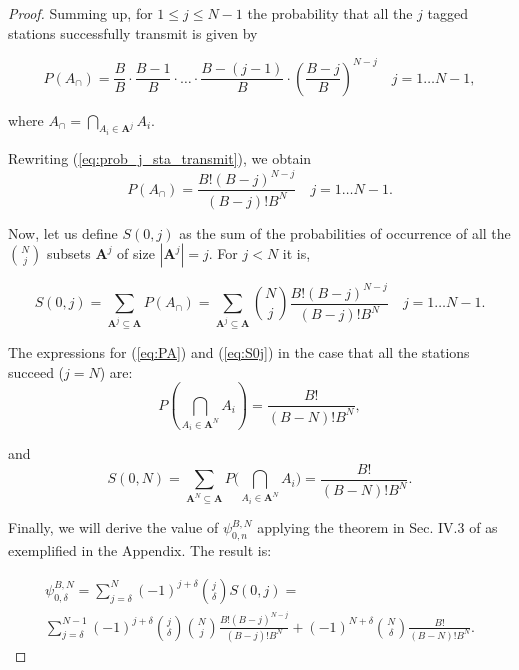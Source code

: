 \documentclass[journal]{IEEEtran}
\begin{document}
\begin{proof}
Summing up, for $1 \leq j \leq N-1$ the probability that all the $j$ tagged stations successfully transmit is given by

\begin{equation}
\label{eq:prob_j_sta_transmit}
P\left( A_\cap \right) = \frac{B}{B} \cdot \frac{B-1}{B} \cdot \dots \cdot \frac{B-(j-1)}{B} \cdot \left( \frac{B-j}{B} \right)^{N-j}\quad j=1\dots N-1,
\end{equation}

where $A_\cap=\bigcap_{ A_i \in \mathbf{A}^j}A_i$.

Rewriting (\ref{eq:prob_j_sta_transmit}), we obtain
\begin{equation}
\label{eq:PA}
P\left( A_\cap \right) = \frac{B! (B-j)^{N-j}}{(B-j)! B^N}
\quad j=1\dots N-1.
\end{equation}

Now, let us define $S(0,j)$ as the sum of the probabilities of occurrence of all the $\binom{N}{j}$ subsets $\mathbf{A}^j$ of size $|\mathbf{A}^j|=j$. For $j < N$ it is, 

\begin{equation}
\label{eq:S0j}
S(0,j)=\sum_{\scriptstyle \mathbf{A}^j\subseteq\mathbf{A}} P\left( A_\cap \right) 
=\sum_{\scriptstyle \mathbf{A}^j\subseteq\mathbf{A}} \binom{N}{j}\frac{B! (B-j)^{N-j}}{(B-j)! B^N}
\quad j=1 \dots N-1.
\end{equation}

The expressions for (\ref{eq:PA}) and (\ref{eq:S0j}) in the case that all the stations succeed ($j=N$) are:
\begin{equation}
P\left( \bigcap_{ A_i \in \mathbf{A}^N } A_i \right) = \frac{B!}{(B-N)! B^N}
,
\end{equation}

and
\begin{equation}
S(0,N)=\sum_{\scriptstyle \mathbf{A}^N\subseteq\mathbf{A}} P\biggl(\bigcap_{A_i\in \mathbf{A}^N} A_i \biggr) 
=\frac{B!}{(B-N)! B^N}.
\end{equation}



Finally, we will derive the value of $\psi_{0,n}^{B,N}$ applying the theorem in Sec. IV.3 of \cite{feller1968ipt} as exemplified in the Appendix.
The result is:

\begin{equation}
\begin{split}
\psi^{B,N}_{0,\delta} = \sum_{j=\delta}^{N} (-1)^{j+\delta}\binom{j}{\delta} S(0,j)= \\
\sum_{j=\delta}^{N-1} (-1)^{j+\delta}\binom{j}{\delta} \binom{N}{j}\frac{B! (B-j)^{N-j}}{(B-j)! B^N}
+ (-1)^{N+\delta}\binom{N}{\delta}\frac{B!}{(B-N)! B^N}.
\end{split}
\label{eq:psi_zero}
\end{equation}


\end{proof}
\end{document}
